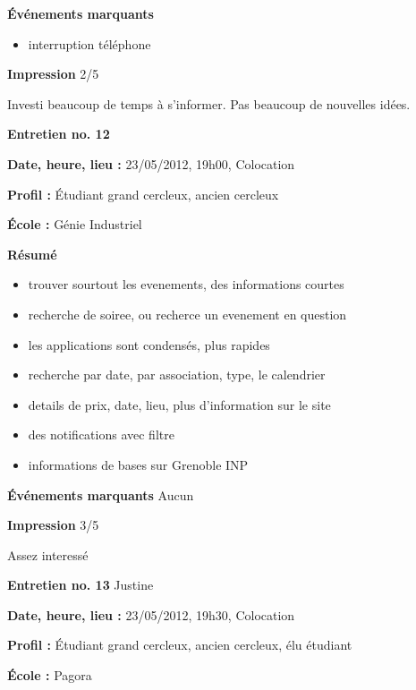 \documentclass[a4paper, 11px]{article}
\begin{document}
\vspace{.25cm}
\textbf{Événements marquants}
	\begin{itemize}
		\item interruption téléphone
	\end{itemize}

\vspace{.25cm}
\textbf{Impression}
2/5

Investi beaucoup de temps à s'informer. Pas beaucoup de nouvelles idées.



\vspace{.3cm}

 \textbf {\large Entretien no. 12}

\textbf{Date, heure, lieu : }
23/05/2012, 19h00, Colocation

\textbf{Profil : }
Étudiant grand cercleux, ancien cercleux

\textbf{École : }
Génie Industriel

\textbf{Résumé}
	\begin{itemize}
		\item trouver sourtout les evenements, des informations courtes
		\item recherche de soiree, ou recherce un evenement en question
		\item les applications sont condensés, plus rapides
		\item recherche par date, par association, type, le calendrier
		\item details de prix, date, lieu, plus d'information sur le site
		\item des notifications avec filtre
		\item informations de bases sur Grenoble INP
	\end{itemize}

\textbf{Événements marquants}
Aucun

\textbf{Impression}
3/5

Assez interessé


\vspace{.3cm}

 \textbf {\large Entretien no. 13}
Justine

\textbf{Date, heure, lieu : }
23/05/2012, 19h30, Colocation

\textbf{Profil : }
Étudiant grand cercleux, ancien cercleux, élu étudiant

\textbf{École : }
Pagora
\end{document}
